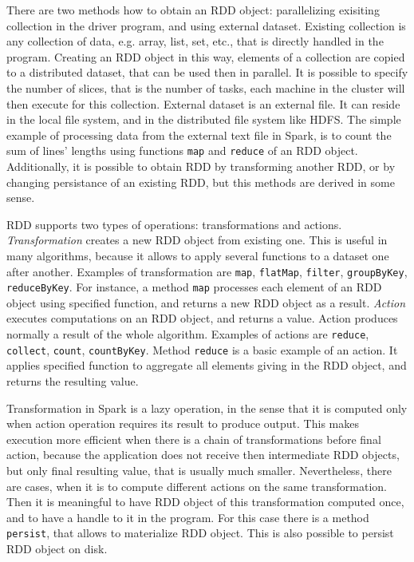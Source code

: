 There are two methods how to obtain an RDD object: parallelizing exisiting collection in the driver program, and using external dataset.
Existing collection is any collection of data, e.g. array, list, set, etc., that is directly handled in the program.
Creating an RDD object in this way, elements of a collection are copied to a distributed dataset, that can be used then in parallel.
It is possible to specify the number of slices, that is the number of tasks, each machine in the cluster will then execute for this collection.
External dataset is an external file.
It can reside in the local file system, and in the distributed file system like HDFS.
The simple example of processing data from the external text file in Spark, is to count the sum of lines' lengths using functions \lstinline{map} and \lstinline{reduce} of an RDD object. 
Additionally, it is possible to obtain RDD by transforming another RDD, or by changing persistance of an existing RDD, but this methods are derived in some sense.

RDD supports two types of operations: transformations and actions.
\textit{Transformation}  creates a new RDD object from existing one.
This is useful in many algorithms, because it allows to apply several functions to a dataset one after another.
Examples of transformation are \lstinline{map}, \lstinline{flatMap}, \lstinline{filter}, \lstinline{groupByKey}, \lstinline{reduceByKey}.
For instance, a method \lstinline{map} processes each element of an RDD object using specified function, and returns a new RDD object as a result.
\textit{Action}  executes computations on an RDD object, and returns a value.
Action produces normally a result of the whole algorithm.
Examples of actions are \lstinline{reduce}, \lstinline{collect}, \lstinline{count}, \lstinline{countByKey}.
Method \lstinline{reduce} is a basic example of an action.
It applies specified function to aggregate all elements giving in the RDD object, and returns the resulting value.

Transformation in Spark is a lazy operation, in the sense that it is computed only when action operation requires its result to produce output.
This makes execution more efficient when there is a chain of transformations before final action, because the application does not receive then intermediate RDD objects, but only final resulting value, that is usually much smaller.
Nevertheless, there are cases, when it is to compute different actions on the same transformation.
Then it is meaningful to have RDD object of this transformation computed once, and to have a handle to it in the program.
For this case there is a method \lstinline{persist}, that allows to materialize RDD object.
This is also possible to persist RDD object on disk.

